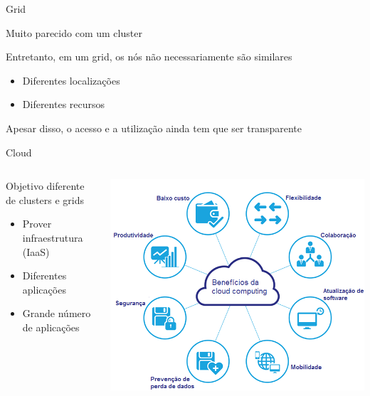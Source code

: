 \documentclass[compress]{beamer}
\begin{document}

\begin{frame}{Grid}

Muito parecido com um cluster

\vspace{0.5cm}

Entretanto, em um grid, os nós não necessariamente são similares
\begin{itemize}
    \item Diferentes localizações
    \item Diferentes recursos
\end{itemize}

\vspace{0.5cm}

Apesar disso, o acesso e a utilização ainda tem que ser transparente
\end{frame}


\begin{frame}{Cloud}

\begin{columns}[T]
    \begin{column}{.35\textwidth}
        Objetivo diferente de clusters e grids
        \begin{itemize}
        \item Prover infraestrutura (IaaS)
        \item Diferentes aplicações
        \item Grande número de aplicações    
        \end{itemize}
    \end{column}
    \begin{column}{.72\textwidth}
        \centering \includegraphics[width=\textwidth]{images/cloud.png}
    \end{column}
\end{columns}
\end{frame}
\end{document}
